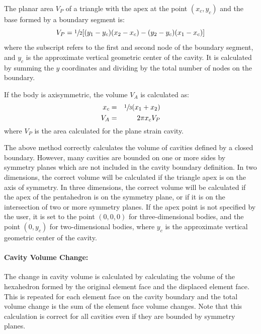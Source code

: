 The planar area $V_P$ of a triangle with the apex at the point
$(x_c,y_c)$ and the base formed by a boundary segment is:
\begin{equation}
V_P = \sfrac{1}{2}[(y_1-y_c) (x_2-x_c) - (y_2-y_c) (x_1-x_c)]
\end{equation}
where the subscript refers to the first and second node of the boundary
segment, and $y_c$ is the approximate vertical geometric center of the
cavity. It is calculated by summing the $y$ coordinates and dividing by
the total number of nodes on the boundary.

If the body is axisymmetric, the volume $V_A$ is calculated as:
\begin{eqnarray}
x_c &=& \sfrac{1}{3}(x_1 + x_2) \nonumber \\
V_A &=& 2\pi x_c V_P
\end{eqnarray}
where $V_P$ is the area calculated for the plane strain cavity.

The above method correctly calculates the volume of cavities defined by
a closed boundary.  However, many cavities are bounded on one or more
sides by symmetry planes which are not included in the cavity boundary
definition.  In two dimensions, the correct volume will be calculated if
the triangle apex is on the axis of symmetry.  In three dimensions, the
correct volume will be calculated if the apex of the pentahedron is on
the symmetry plane, or if it is on the intersection of two or more
symmetry planes.  If the apex point is not specified  by the user, it is
set to the point $(0,0,0)$ for three-dimensional bodies, and the point
$(0,y_c)$ for two-dimensional bodies, where $y_c$ is the approximate
vertical geometric center of the cavity.

\paragraph*{Cavity Volume Change:}
The change in cavity volume is calculated by calculating the volume of
the hexahedron formed by the original element face and the displaced
element face.  This is repeated for each element face on the cavity
boundary and the total volume change is the sum of the element face
volume changes.  Note that this calculation is correct for all cavities
even if they are bounded by symmetry planes.

